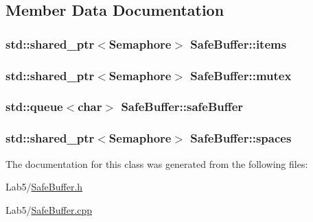 \subsection{Member Data Documentation}
\subsubsection[{\texorpdfstring{items}{items}}]{\setlength{\rightskip}{0pt plus 5cm}std\+::shared\+\_\+ptr$<${\bf Semaphore}$>$ Safe\+Buffer\+::items}\hypertarget{class_safe_buffer_aab374b9839a583473e1ec8938715a8e7}{}\label{class_safe_buffer_aab374b9839a583473e1ec8938715a8e7}
\subsubsection[{\texorpdfstring{mutex}{mutex}}]{\setlength{\rightskip}{0pt plus 5cm}std\+::shared\+\_\+ptr$<${\bf Semaphore}$>$ Safe\+Buffer\+::mutex}\hypertarget{class_safe_buffer_a7f90950b182359904348ff978ebb96c6}{}\label{class_safe_buffer_a7f90950b182359904348ff978ebb96c6}
\subsubsection[{\texorpdfstring{safe\+Buffer}{safeBuffer}}]{\setlength{\rightskip}{0pt plus 5cm}std\+::queue$<$char$>$ Safe\+Buffer\+::safe\+Buffer}\hypertarget{class_safe_buffer_a8db738cc1b4be3eeba47f322008a2c3e}{}\label{class_safe_buffer_a8db738cc1b4be3eeba47f322008a2c3e}
\subsubsection[{\texorpdfstring{spaces}{spaces}}]{\setlength{\rightskip}{0pt plus 5cm}std\+::shared\+\_\+ptr$<${\bf Semaphore}$>$ Safe\+Buffer\+::spaces}\hypertarget{class_safe_buffer_aa8de2bc2e0f6672f448ef0095faacf8c}{}\label{class_safe_buffer_aa8de2bc2e0f6672f448ef0095faacf8c}


The documentation for this class was generated from the following files\+:\begin{DoxyCompactItemize}
\item 
Lab5/\hyperlink{_safe_buffer_8h}{Safe\+Buffer.\+h}\item 
Lab5/\hyperlink{_safe_buffer_8cpp}{Safe\+Buffer.\+cpp}\end{DoxyCompactItemize}
